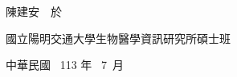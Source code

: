\begin{CJK*}{UTF8}{bkai}
\vspace{2cm}
\begin{flushright}
陳建安　於

國立陽明交通大學生物醫學資訊研究所碩士班

中華民國 \, 113 年 \, 7 \,月
\end{flushright}
\end{CJK*}
